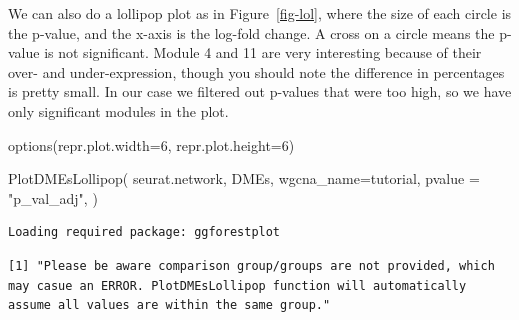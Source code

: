 \documentclass[
  letterpaper,
  DIV=11,
  numbers=noendperiod]{scrartcl}
\newenvironment{Shaded}{\begin{snugshade}}{\end{snugshade}}
\newcommand{\AttributeTok}[1]{\textcolor[rgb]{0.49,0.56,0.16}{#1}}
\newcommand{\DecValTok}[1]{\textcolor[rgb]{0.25,0.63,0.44}{#1}}
\newcommand{\FunctionTok}[1]{\textcolor[rgb]{0.02,0.16,0.49}{#1}}
\newcommand{\NormalTok}[1]{\textcolor[rgb]{0.00,0.44,0.13}{#1}}
\newcommand{\StringTok}[1]{\textcolor[rgb]{0.25,0.44,0.63}{#1}}
\begin{document}
We can also do a lollipop plot as in Figure~\ref{fig-lol}, where the
size of each circle is the p-value, and the x-axis is the log-fold
change. A cross on a circle means the p-value is not significant. Module
4 and 11 are very interesting because of their over- and
under-expression, though you should note the difference in percentages
is pretty small. In our case we filtered out p-values that were too
high, so we have only significant modules in the plot.

\begin{Shaded}
\begin{Highlighting}[]
\FunctionTok{options}\NormalTok{(}\AttributeTok{repr.plot.width=}\DecValTok{6}\NormalTok{, }\AttributeTok{repr.plot.height=}\DecValTok{6}\NormalTok{)}

\FunctionTok{PlotDMEsLollipop}\NormalTok{(}
\NormalTok{  seurat.network, }
\NormalTok{  DMEs, }
  \AttributeTok{wgcna\_name=}\StringTok{\textquotesingle{}tutorial\textquotesingle{}}\NormalTok{, }
  \AttributeTok{pvalue =} \StringTok{"p\_val\_adj"}\NormalTok{,}
\NormalTok{)}
\end{Highlighting}
\end{Shaded}

\begin{verbatim}
Loading required package: ggforestplot
\end{verbatim}

\begin{verbatim}
[1] "Please be aware comparison group/groups are not provided, which may casue an ERROR. PlotDMEsLollipop function will automatically assume all values are within the same group."
\end{verbatim}
\end{document}
